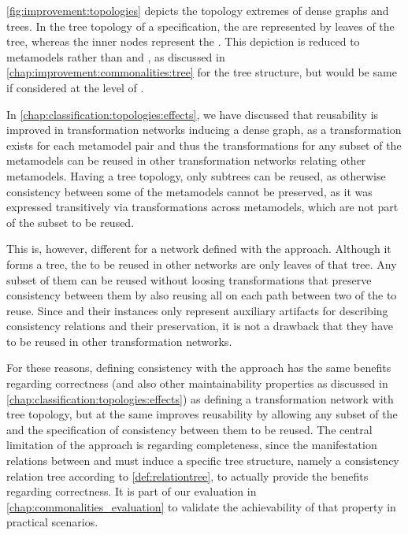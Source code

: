 \autoref{fig:improvement:topologies} depicts the topology extremes of dense graphs and trees.
In the tree topology of a \commonality specification, the \concretemetamodels are represented by leaves of the tree, whereas the inner nodes represent the \conceptmetamodels.
This depiction is reduced to metamodels rather than \metaclasses and \commonalities, as discussed in \autoref{chap:improvement:commonalities:tree} for the tree structure, but would be same if considered at the level of \metaclasses.

In \autoref{chap:classification:topologies:effects}, we have discussed that reusability is improved in transformation networks inducing a dense graph, as a transformation exists for each metamodel pair and thus the transformations for any subset of the metamodels can be reused in other transformation networks relating other metamodels.
Having a tree topology, only subtrees can be reused, as otherwise consistency between some of the metamodels cannot be preserved, as it was expressed transitively via transformations across metamodels, which are not part of the subset to be reused.

This is, however, different for a network defined with the \commonalities approach.
Although it forms a tree, the \concretemetamodels to be reused in other networks are only leaves of that tree.
Any subset of them can be reused without loosing transformations that preserve consistency between them by also reusing all \conceptmetamodels on each path between two of the \concretemetamodels to reuse.
Since \conceptmetamodels and their instances only represent auxiliary artifacts for describing consistency relations and their preservation, it is not a drawback that they have to be reused in other transformation networks.

For these reasons, defining consistency with the \commonalities approach has the same benefits regarding correctness (and also other maintainability properties as discussed in \autoref{chap:classification:topologies:effects}) as defining a transformation network with tree topology, but at the same improves reusability by allowing any subset of the \concretemetamodels and the specification of consistency between them to be reused.
The central limitation of the approach is regarding completeness, since the manifestation relations between \metaclasses and \commonalities must induce a specific tree structure, namely a consistency relation tree according to \autoref{def:relationtree}, to actually provide the benefits regarding correctness.
It is part of our evaluation in \autoref{chap:commonalities_evaluation} to validate the achievability of that property in practical scenarios.

